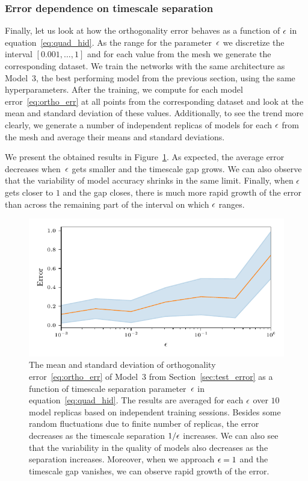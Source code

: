 \documentclass{article}
\begin{document}
\subsubsection{Error dependence on timescale separation}
\label{sec:err_vs_eps}

Finally, let us look at how the orthogonality error behaves as a function of $\epsilon$ in equation~\eqref{eq:quad_hid}. As the range for the parameter~$\epsilon$ we discretize the interval $[0.001,\dotsc,1]$ and for each value from the mesh we generate the corresponding dataset. We train the networks with the same architecture as Model~3, the best performing model from the previous section, using the same hyperparameters. After the training, we compute for each model error~\eqref{eq:ortho_err} at all points from the corresponding dataset and look at the mean and standard deviation of these values. Additionally, to see the trend more clearly, we generate a number of independent replicas of models for each $\epsilon$ from the mesh and average their means and standard deviations.

We present the obtained results in Figure~\ref{fig:quad4d_eps_err_derivatives}. As expected, the average error decreases when~$\epsilon$ gets smaller and the timescale gap grows. We can also observe that the variability of model accuracy shrinks in the same limit. Finally, when $\epsilon$ gets closer to $1$ and the gap closes, there is much more rapid growth of the error than across the remaining part of the interval on which $\epsilon$ ranges.

\begin{figure}
    \centering
    \includegraphics[]{figs/quad4d_eps_err_derivatives.pdf}
    \caption{
    The mean and standard deviation of orthogonality error~\eqref{eq:ortho_err} of Model~3 from Section~\ref{sec:test_error} as a function of timescale separation parameter~$\epsilon$ in equation~\eqref{eq:quad_hid}. The results are averaged for each $\epsilon$ over $10$ model replicas based on independent training sessions. Besides some random fluctuations due to finite number of replicas, the error decreases as the timescale separation $1/\epsilon$ increases. We can also see that the variability in the quality of models also decreases as the separation increases. Moreover, when we approach $\epsilon=1$ and the timescale gap vanishes, we can observe rapid growth of the error.
    }
    \label{fig:quad4d_eps_err_derivatives}
\end{figure}
\end{document}
